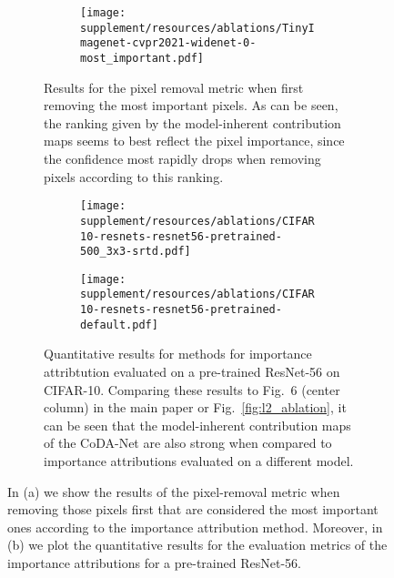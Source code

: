 \begin{figure}
\centering
    \begin{subfigure}[c]{\textwidth}
    \centering
    \begin{subfigure}[c]{0.45\textwidth}
    \centering
    \texttt{[image: supplement/resources/ablations/TinyImagenet-cvpr2021-widenet-0-most\_important.pdf]}
    \end{subfigure}
    \caption{Results for the pixel removal metric when first removing the most important pixels. As can be seen, the ranking given by the model-inherent contribution maps seems to best reflect the pixel importance, since the confidence most rapidly drops when removing pixels according to this ranking.}
    \label{fig:most_important}
    \vspace{.75em}
    \end{subfigure}
    \begin{subfigure}[c]{\textwidth}
    \centering
    \begin{subfigure}[c]{0.45\textwidth}
    \centering
    \texttt{[image: supplement/resources/ablations/CIFAR10-resnets-resnet56-pretrained-500\_3x3-srtd.pdf]}
    \end{subfigure}
    \begin{subfigure}[c]{0.45\textwidth}
    \centering
    \texttt{[image: supplement/resources/ablations/CIFAR10-resnets-resnet56-pretrained-default.pdf]}
    \end{subfigure}
    \caption{Quantitative results for methods for importance attribtution evaluated on a pre-trained ResNet-56 on CIFAR-10. Comparing these results to Fig.~6 (center column) in the main paper or Fig.~\ref{fig:l2_ablation}, it can be seen that the model-inherent contribution maps of the CoDA-Net are also strong when compared to importance attributions evaluated on a different model.}
    \label{fig:resnet_results}
    \vspace{.75em}
    \end{subfigure}
    \caption{In (a) we show the results of the pixel-removal metric when removing those pixels first that are considered the most important ones according to the importance attribution method. Moreover, in (b) we plot the quantitative results for the evaluation metrics of the importance attributions for a pre-trained ResNet-56.}
    \vspace{-.25em}
\end{figure}

